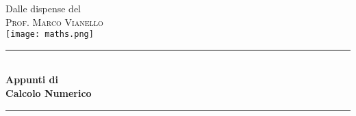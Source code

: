 \documentclass[12pt,a4paper,headings=optiontohead,openany]{scrbook}
\begin{document}

\begin{titlepage}

\newcommand{\HRule}{\rule{\linewidth}{0.5mm}} %

\center %
 


\large Dalle dispense del\\[0.5cm] %
\textsc{\Large Prof. Marco Vianello}\\[1.5cm] %

\texttt{[image: maths.png]}\\[0.3cm]

\HRule \\[0.4cm]
{ \huge \bfseries Appunti di}\\
{ \huge \bfseries Calcolo Numerico\\[0.15 cm]} %
\HRule \\[1cm]
 


\end{titlepage}
\end{document}

